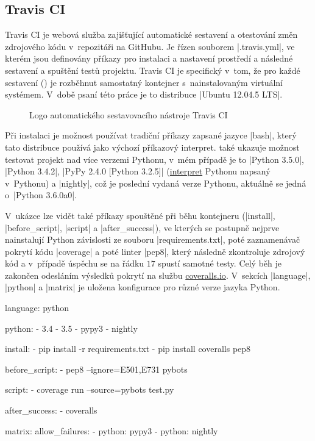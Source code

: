 \subsection{Travis CI}
\label{subsec:travis-ci}

	Travis CI je webová služba zajišťující automatické sestavení a otestování změn zdrojového kódu v~repozitáři na GitHubu. Je řízen souborem \ic|.travis.yml|, ve kterém jsou definovány příkazy pro instalaci a nastavení prostředí a následné sestavení a spuštění testů projektu. Travis CI je specifický v~tom, že pro každé sestavení () je rozběhnut samostatný kontejner s~nainstalovaným virtuální systémem. V~době psaní této práce je to distribuce \ic|Ubuntu 12.04.5 LTS|. 

\begin{figure}
	\centering
	
	\caption{Logo automatického sestavovacího nástroje Travis CI}
\end{figure}

	Při instalaci je možnost používat tradiční příkazy zapsané jazyce \ic|bash|, který tato distribuce používá jako výchozí příkazový interpret.  také ukazuje možnost testovat projekt nad více verzemi Pythonu, v~mém případě je to \ic|Python 3.5.0|, \ic|Python 3.4.2|, \ic|PyPy 2.4.0 [Python 3.2.5]| (\href{http://pypy.org/}{interpret} Pythonu napsaný v~Pythonu) a \ic|nightly|, což je poslední vydaná verze Pythonu, aktuálně se jedná o~\ic|Python 3.6.0a0|.

	V~ukázce lze vidět také příkazy spouštěné při běhu kontejneru (\ic|install|, \ic|before_script|, \ic|script| a \ic|after_success|), ve kterých se postupně nejprve nainstalují Python závislosti ze souboru \ic|requirements.txt|, poté zaznamenávač pokrytí kódu \ic|coverage| a poté linter \ic|pep8|, který následně zkontroluje zdrojový kód a v~případě úspěchu se na řádku $17$ spustí samotné testy. Celý běh je zakončen odesláním výsledků pokrytí na službu \href{https://coveralls.io/}{coveralls.io}. V~sekcích \ic|language|, \ic|python| a \ic|matrix| je uložena konfigurace pro různé verze jazyka Python.


\begin{code}[caption={Zkrácená ukázka konfiguračního soubotu .travis.yml},label={lst:travis-yml},keywords={}]
language: python

python:
  - 3.4
  - 3.5
  - pypy3
  - nightly

install:
  - pip install -r requirements.txt
  - pip install coveralls pep8

before_script:
  - pep8 --ignore=E501,E731 pybots

script:
  - coverage run --source=pybots test.py

after_success:
  - coveralls

matrix:
  allow_failures:
    - python: pypy3
    - python: nightly
\end{code}

